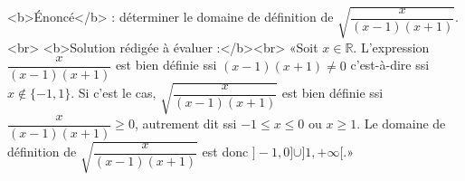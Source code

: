 <b>Énoncé</b> : déterminer le domaine de définition de $\sqrt{\dfrac{x}{(x-1)(x+1)}}$.<br> <b>Solution rédigée à évaluer :</b><br>  «Soit $x\in\mathbb{R}$.  L'expression $\dfrac{x}{(x-1)(x+1)}$ est bien définie ssi $(x-1)(x+1)\neq 0$ c'est-à-dire ssi $x\not\in\{-1,1\}$. Si c'est le cas, $\sqrt{\dfrac{x}{(x-1)(x+1)}}$ est bien définie ssi $\dfrac{x}{(x-1)(x+1)}\geq 0$, autrement dit ssi $-1\leq x\leq 0$ ou $x\geq 1$. Le domaine de définition de $\sqrt{\dfrac{x}{(x-1)(x+1)}}$ est donc $]-1,0]\cup ]1,+\infty[$.»

\begin{reponses}
\end{reponses}

